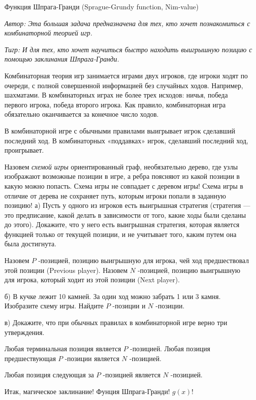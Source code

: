 \begin{problem}
 Функция Шпрага-Гранди (Sprague-Grundy function, Nim-value)

{\it Автор: Эта большая задача предназначена для тех, кто хочет познакомиться с комбинаторной теорией игр. }\par
{\it Тигр: И для тех, кто хочет научиться быстро находить выигрышную позицию с помощью заклинания Шпрага-Гранди.}\par
Комбинаторная теория игр занимается играми двух игроков, где игроки ходят по очереди, с полной совершенной информацией без случайных ходов. Например, шахматами. В комбинаторных играх не более трех исходов: ничья, победа первого игрока, победа второго игрока. Как правило, комбинаторная игра обязательно оканчивается за конечное число ходов.\par
В комбинаторной игре с обычными правилами выигрывает игрок сделавший последний ход. В комбинаторных «поддавках» игрок, сделавший последний ход, проигрывает.\par
Назовем {\it схемой игры} ориентированный граф, необязательно дерево, где узлы изображают возможные позиции в игре, а ребра поясняют из какой позиции в какую можно попасть. Схема игры не совпадает с деревом игры! Схема игры в отличие от дерева не сохраняет путь, которым игроки попали в заданную позицию!
а)	Пусть у одного из игроков есть выигрышная стратегия (стратегия — это предписание, какой делать в зависимости от того, какие ходы были сделаны до этого). Докажите, что у него есть выигрышная стратегия, которая является функцией только от текущей позиции, и не учитывает того, каким путем она была достигнута. \par
Назовем  $P$ -позицией, позицию выигрышную для игрока, чей ход предшествовал этой позиции (Previous player). Назовем  $N$ -позицией, позицию выигрышную для игрока, который ходит из этой позиции (Next player).\par
б)	В кучке лежит 10 камней. За один ход можно забрать 1 или 3 камня. Изобразите схему игры. Найдите  $P$ -позиции и  $N$ -позиции.\par
в)	Докажите, что при обычных правилах в комбинаторной игре верно три утверждения. \par
Любая терминальная позиция является  $P$ -позицией.
Любая позиция предшествующая  $P$ -позиции является  $N$ -позицией. \par
Любая позиция следующая за  $P$ -позицией является  $N$ -позицией.\par
Итак, магическое заклинание! Фунция Шпрага-Гранди!  $g\left(x\right)$!\par

\end{problem}
